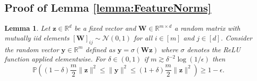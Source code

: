 \documentclass{article}
\newtheorem{lemma}[theorem]{Lemma}
\theoremstyle{definition}
\newcommand*{\R}{\mathbb{R}}
\renewcommand{\P}{\mathbb{P}}
\def\vy{{\bm{y}}}
\def\vz{{\bm{z}}}
\def\mW{{\bm{W}}}
\begin{document}
\subsection{Proof of Lemma \ref{lemma:FeatureNorms}} \label{app:FeatureNorms} 
\begin{lemma} \label{lemma:feature-norm-helper1}
    Let $\vz \in \R^d$ be a fixed vector and $\mW \in \R^{m \times d}$ a random matrix with mutually iid elements $[\mW]_{ij} \sim \mathcal{N}(0,1)$ for all $i \in [m]$ and $j \in [d]$. Consider the random vector $\vy \in \R^{m}$ defined as $\vy = \sigma(\mW \vz)$ where $\sigma$ denotes the ReLU function applied elementwise. For $\delta \in (0,1)$ if $m \gtrsim \delta^{-2}\log(1/ \epsilon)$ then
    \[
      \P\left((1 - \delta)\frac{m}{2}\| \vz \|^2 \leq \| \vy \|^2 \leq (1 + \delta)\frac{m}{2}\| \vz \|^2 \right) \geq 1 - \epsilon.
    \]
\end{lemma}
\end{document}
